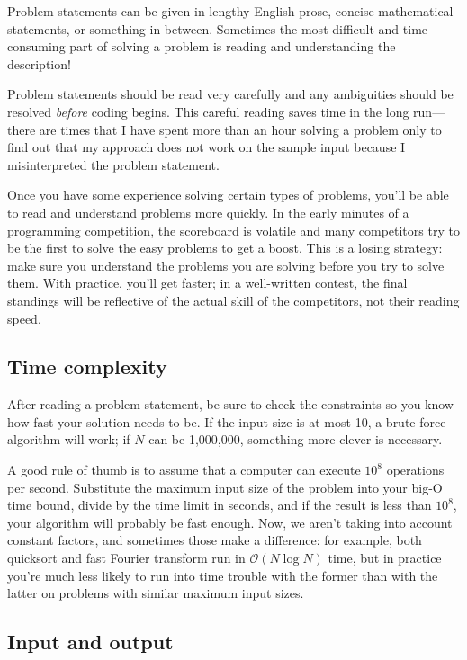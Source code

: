 Problem statements can be given in lengthy English prose, concise mathematical statements, or something in between. Sometimes the most difficult and time-consuming part of solving a problem is reading and understanding the description!

Problem statements should be read very carefully and any ambiguities should be resolved \textit{before} coding begins. This careful reading saves time in the long run---there are times that I have spent more than an hour solving a problem only to find out that my approach does not work on the sample input because I misinterpreted the problem statement.

Once you have some experience solving certain types of problems, you'll be able to read and understand problems more quickly. In the early minutes of a programming competition, the scoreboard is volatile and many competitors try to be the first to solve the easy problems to get a boost. This is a losing strategy: make sure you understand the problems you are solving before you try to solve them. With practice, you'll get faster; in a well-written contest, the final standings will be reflective of the actual skill of the competitors, not their reading speed.

\subsection*{Time complexity}

After reading a problem statement, be sure to check the constraints so you know how fast your solution needs to be. If the input size is at most 10, a brute-force algorithm will work; if $N$ can be 1,000,000, something more clever is necessary.

A good rule of thumb is to assume that a computer can execute $10^8$ operations per second. Substitute the maximum input size of the problem into your big-O time bound, divide by the time limit in seconds, and if the result is less than $10^8$, your algorithm will probably be fast enough. Now, we aren't taking into account constant factors, and sometimes those make a difference: for example, both quicksort and fast Fourier transform run in $\mathcal{O}(N \log N)$ time, but in practice you're much less likely to run into time trouble with the former than with the latter on problems with similar maximum input sizes.

\subsection*{Input and output}

